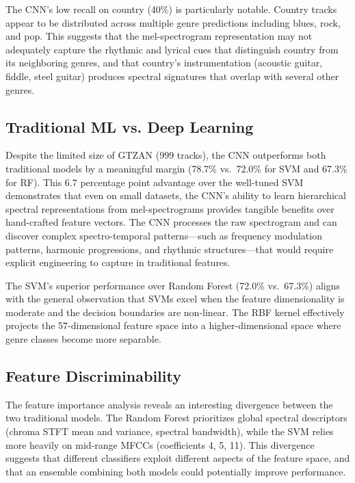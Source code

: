 \documentclass[10pt,journal]{IEEEtran}
\begin{document}
The CNN's low recall on country (40\%) is particularly notable. Country tracks appear to be distributed across multiple genre predictions including blues, rock, and pop. This suggests that the mel-spectrogram representation may not adequately capture the rhythmic and lyrical cues that distinguish country from its neighboring genres, and that country's instrumentation (acoustic guitar, fiddle, steel guitar) produces spectral signatures that overlap with several other genres.

\subsection{Traditional ML vs. Deep Learning}

Despite the limited size of GTZAN (999 tracks), the CNN outperforms both traditional models by a meaningful margin (78.7\% vs.\ 72.0\% for SVM and 67.3\% for RF). This 6.7 percentage point advantage over the well-tuned SVM demonstrates that even on small datasets, the CNN's ability to learn hierarchical spectral representations from mel-spectrograms provides tangible benefits over hand-crafted feature vectors. The CNN processes the raw spectrogram and can discover complex spectro-temporal patterns---such as frequency modulation patterns, harmonic progressions, and rhythmic structures---that would require explicit engineering to capture in traditional features.

The SVM's superior performance over Random Forest (72.0\% vs.\ 67.3\%) aligns with the general observation that SVMs excel when the feature dimensionality is moderate and the decision boundaries are non-linear. The RBF kernel effectively projects the 57-dimensional feature space into a higher-dimensional space where genre classes become more separable.

\subsection{Feature Discriminability}

The feature importance analysis reveals an interesting divergence between the two traditional models. The Random Forest prioritizes global spectral descriptors (chroma STFT mean and variance, spectral bandwidth), while the SVM relies more heavily on mid-range MFCCs (coefficients 4, 5, 11). This divergence suggests that different classifiers exploit different aspects of the feature space, and that an ensemble combining both models could potentially improve performance.
\end{document}
